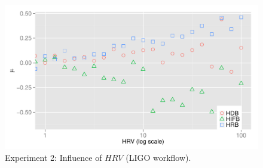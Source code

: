 \begin{figure}[htb]
\centering
	\includegraphics[width=\linewidth]{figure/exp3.pdf}
	\caption{Experiment 2: Influence of $HRV$ (LIGO workflow).}
	\label{fig:incluence_of_hrv}
	\vspace{-10pt}
\end{figure}




